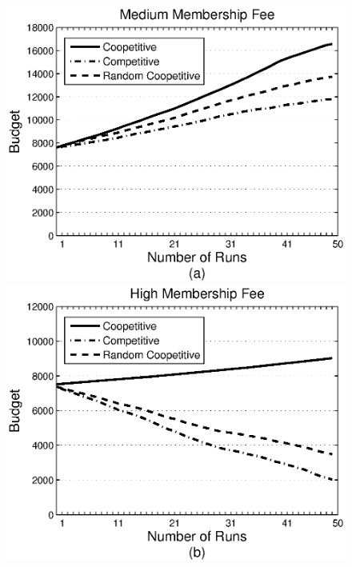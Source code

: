 \documentclass[fleqn]{singlecol-new}
\begin{document}

\begin{figure}%
\centering
\includegraphics[scale=0.302]{graphbgtmed3set.eps}
\includegraphics[scale=0.302]{graphbgthigh.eps}

\end{figure}
\end{document}
